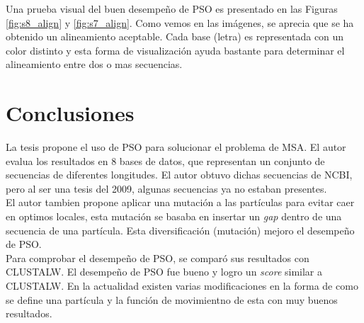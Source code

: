 \documentclass{cup-pan}
\begin{document}
	Una prueba visual del buen desempeño de PSO es presentado en las Figuras \ref{fig:s8_align} y \ref{fig:s7_align}. Como vemos en las imágenes, se aprecia que se ha obtenido un alineamiento aceptable. Cada base (letra) es representada con un color distinto y esta forma de visualización ayuda bastante para determinar el alineamiento entre dos o mas secuencias.
	
	\section{Conclusiones}
	
	La tesis propone el uso de PSO para solucionar el problema de MSA. El autor evalua los resultados en 8 bases de datos, que representan un conjunto de secuencias de diferentes longitudes. El autor obtuvo dichas secuencias de NCBI, pero al ser una tesis del 2009, algunas secuencias ya no estaban presentes.\\
	
	El autor tambien propone aplicar una mutación a las partículas para evitar caer en optimos locales, esta mutación se basaba en insertar un \textit{gap} dentro de una secuencia de una partícula. Esta diversificación (mutación) mejoro el desempeño de PSO. \\
	
	Para comprobar el desempeño de PSO, se comparó sus resultados con CLUSTALW. El desempeño de PSO fue bueno y logro un \textit{score} similar a CLUSTALW. En la actualidad existen varias modificaciones en la forma de como se define una partícula y la función de movimientno de esta con muy buenos resultados. \\
	
	
	
	
	
	\printbibliography
\end{document}
